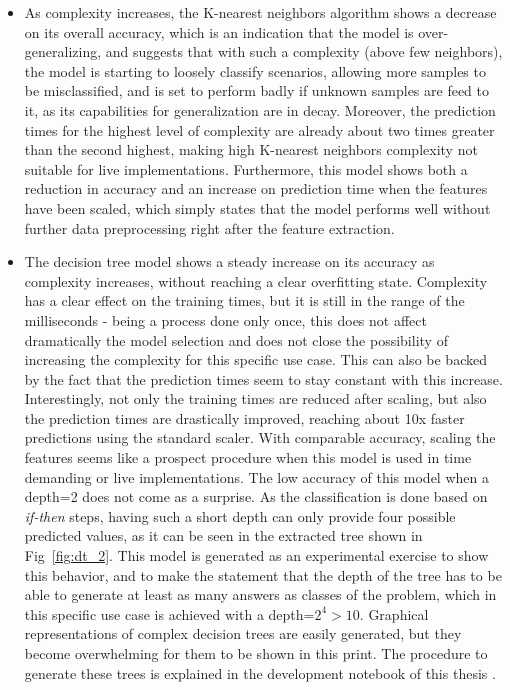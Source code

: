 \begin{itemize}
    \item As complexity increases, the K-nearest neighbors algorithm shows a decrease on its overall accuracy, which is an indication that the model is over-generalizing, and suggests that with such a complexity (above few neighbors), the model is starting to loosely classify scenarios, allowing more samples to be misclassified, and is set to perform badly if unknown samples are feed to it, as its capabilities for generalization are in decay. Moreover, the prediction times for the highest level of complexity are already about two times greater than the second highest, making high K-nearest neighbors complexity not suitable for live implementations. Furthermore, this model shows both a reduction in accuracy and an increase on prediction time when the features have been scaled, which simply states that the model performs well without further data preprocessing right after the feature extraction.
    \item The decision tree model shows a steady increase on its accuracy as complexity increases, without reaching a clear overfitting state. Complexity has a clear effect on the training times, but it is still in the range of the milliseconds - being a process done only once, this does not affect dramatically the model selection and does not close the possibility of increasing the complexity for this specific use case. This can also be backed by the fact that the prediction times seem to stay constant with this increase. Interestingly, not only the training times are reduced after scaling, but also the prediction times are drastically improved, reaching about 10x faster predictions using the standard scaler. With comparable accuracy, scaling the features seems like a prospect procedure when this model is used in time demanding or live implementations.
        The low accuracy of this model when a depth=2 does not come as a surprise. As the classification is done based on \emph{if-then} steps, having such a short depth can only provide four possible predicted values, as it can be seen in the extracted tree shown in Fig~\ref{fig:dt_2}. This model is generated as an experimental exercise to show this behavior, and to make the statement that the depth of the tree has to be able to generate at least as many answers as classes of the problem, which in this specific use case is achieved with a depth=\(2^4 > 10\). Graphical representations of complex decision trees are easily generated, but they become overwhelming for them to be shown in this print. The procedure to generate these trees is explained in the development notebook of this thesis \cite{repo:cognitive_radio_ml}.


\end{itemize}
